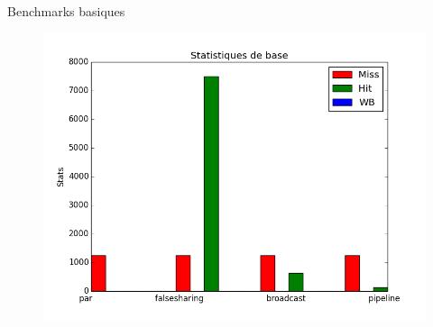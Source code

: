 \begin{frame}{Benchmarks basiques}
\begin{figure}[t!]
  \includegraphics[scale=0.22]{images/stats_L3.png}
\end{figure}
\end{frame}

